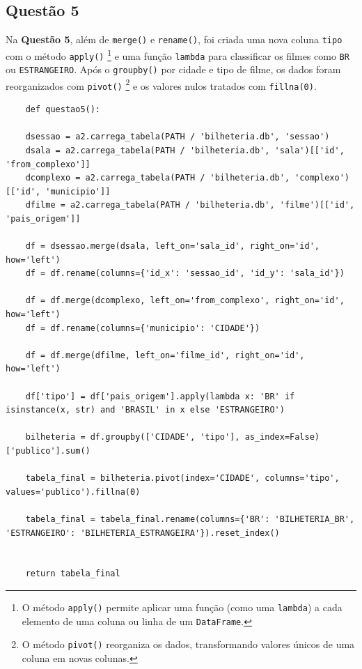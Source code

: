 \documentclass{article}
\begin{document}
\subsection*{Questão 5}
\linespread{1.5}
Na \textbf{Questão 5}, além de \texttt{merge()} e \texttt{rename()}, foi criada uma nova coluna \texttt{tipo} com o método \texttt{apply()} \footnote{O método \texttt{apply()} permite aplicar uma função (como uma \texttt{lambda}) a cada elemento de uma coluna ou linha de um \texttt{DataFrame}.} e uma função \texttt{lambda} para classificar os filmes como \texttt{BR} ou \texttt{ESTRANGEIRO}. Após o \texttt{groupby()} por cidade e tipo de filme, os dados foram reorganizados com \texttt{pivot()} \footnote{O método \texttt{pivot()} reorganiza os dados, transformando valores únicos de uma coluna em novas colunas.} e os valores nulos tratados com \texttt{fillna(0)}.
\linespread{1}
\begin{lstlisting}
    def questao5():
    
    dsessao = a2.carrega_tabela(PATH / 'bilheteria.db', 'sessao')
    dsala = a2.carrega_tabela(PATH / 'bilheteria.db', 'sala')[['id', 'from_complexo']]
    dcomplexo = a2.carrega_tabela(PATH / 'bilheteria.db', 'complexo')[['id', 'municipio']]
    dfilme = a2.carrega_tabela(PATH / 'bilheteria.db', 'filme')[['id', 'pais_origem']]

    df = dsessao.merge(dsala, left_on='sala_id', right_on='id', how='left')
    df = df.rename(columns={'id_x': 'sessao_id', 'id_y': 'sala_id'})

    df = df.merge(dcomplexo, left_on='from_complexo', right_on='id', how='left')
    df = df.rename(columns={'municipio': 'CIDADE'})

    df = df.merge(dfilme, left_on='filme_id', right_on='id', how='left')

    df['tipo'] = df['pais_origem'].apply(lambda x: 'BR' if isinstance(x, str) and 'BRASIL' in x else 'ESTRANGEIRO')

    bilheteria = df.groupby(['CIDADE', 'tipo'], as_index=False)['publico'].sum()

    tabela_final = bilheteria.pivot(index='CIDADE', columns='tipo', values='publico').fillna(0)

    tabela_final = tabela_final.rename(columns={'BR': 'BILHETERIA_BR', 'ESTRANGEIRO': 'BILHETERIA_ESTRANGEIRA'}).reset_index()
    

    return tabela_final

\end{lstlisting}
\end{document}
